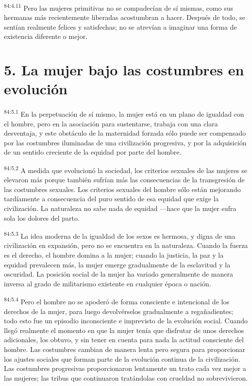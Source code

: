 \documentclass[twoside, 11pt]{book}
\begin{document}
\par
\textsuperscript{84:4.11} Pero las mujeres primitivas no se compadecían de sí mismas, como sus hermanas más recientemente liberadas acostumbran a hacer. Después de todo, se sentían realmente felices y satisfechas; no se atrevían a imaginar una forma de existencia diferente o mejor.

\section*{5. La mujer bajo las costumbres en evolución}
\par
\textsuperscript{84:5.1} En la perpetuación de sí mismo, la mujer está en un plano de igualdad con el hombre, pero en la asociación para sustentarse, trabaja con una clara desventaja, y este obstáculo de la maternidad forzada sólo puede ser compensado por las costumbres iluminadas de una civilización progresiva, y por la adquisición de un sentido creciente de la equidad por parte del hombre.

\par
\textsuperscript{84:5.2} A medida que evolucionó la sociedad, los criterios sexuales de las mujeres se elevaron más porque también sufrían más las consecuencias de la transgresión de las costumbres sexuales. Los criterios sexuales del hombre sólo están mejorando tardíamente a consecuencia del puro sentido de esa equidad que exige la civilización. La naturaleza no sabe nada de equidad ---hace que la mujer sufra sola los dolores del parto.

\par
\textsuperscript{84:5.3} La idea moderna de la igualdad de los sexos es hermosa, y digna de una civilización en expansión, pero no se encuentra en la naturaleza. Cuando la fuerza es el derecho, el hombre domina a la mujer; cuando la justicia, la paz y la equidad prevalecen más, la mujer emerge gradualmente de la esclavitud y la oscuridad. La posición social de la mujer ha variado generalmente de manera inversa al grado de militarismo existente en cualquier época o nación.

\par
\textsuperscript{84:5.4} Pero el hombre no se apoderó de forma consciente e intencional de los derechos de la mujer, para luego devolvérselos gradualmente a regañadientes; todo esto fue un episodio inconsciente e imprevisto de la evolución social. Cuando llegó realmente el momento en que la mujer tenía que disfrutar de unos derechos adicionales, los obtuvo, y sin tener en cuenta para nada la actitud consciente del hombre. Las costumbres cambian de manera lenta pero segura para proporcionar los ajustes sociales que forman parte de la evolución continua de la civilización. Las costumbres progresivas proporcionaron lentamente un trato cada vez mejor a las mujeres; las tribus que continuaron tratándolas con crueldad no sobrevivieron.
\end{document}
